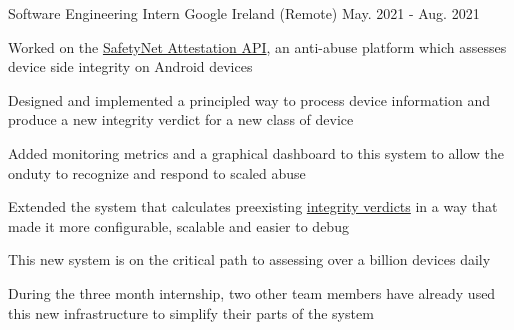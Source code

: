 
\hypersetup{
    colorlinks=true,
    linkcolor=blue,
    filecolor=magenta,
    urlcolor=awesome,
}



\begin{cventries}

  \cventry
    {Software Engineering Intern} %
    {Google} %
    {Ireland (Remote)} %
    {May. 2021 - Aug. 2021} %
    {
      \begin{cvitems} %
      \item Worked on the \href{https://developer.android.com/training/safetynet/attestation}{SafetyNet Attestation API}, an anti-abuse platform which assesses device side integrity on Android devices
        \item Designed and implemented a principled way to process device information and produce a new integrity verdict for a new class of device
        \item Added monitoring metrics and a graphical dashboard to this system to allow the onduty to recognize and respond to scaled abuse
        \item Extended the system that calculates preexisting \href{https://developer.android.com/training/safetynet/attestation\#potential-integrity-verdicts}{integrity verdicts} in a way that made it more configurable, scalable and easier to debug
        \item This new system is on the critical path to assessing over a billion devices daily
        \item During the three month internship, two other team members have already used this new infrastructure to simplify their parts of the system
      \end{cvitems}
    }


\end{cventries}
